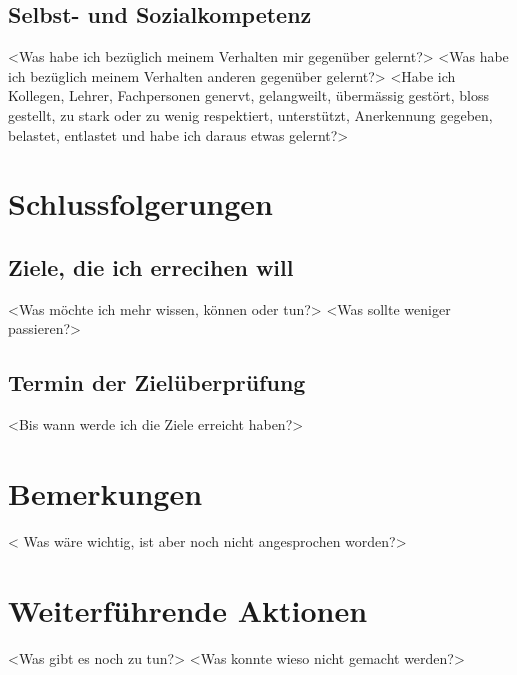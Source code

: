 \subsection{Selbst- und Sozialkompetenz}
<Was habe ich bezüglich meinem Verhalten mir gegenüber gelernt?>
<Was habe ich bezüglich meinem Verhalten anderen gegenüber gelernt?>
<Habe ich Kollegen, Lehrer, Fachpersonen genervt, gelangweilt, übermässig gestört, bloss gestellt, zu stark oder zu wenig respektiert, unterstützt, Anerkennung gegeben, belastet, entlastet und habe ich daraus etwas gelernt?>

\section{Schlussfolgerungen}
\subsection{Ziele, die ich errecihen will}
<Was möchte ich mehr wissen, können oder tun?>
<Was sollte weniger passieren?>
\subsection{Termin der Zielüberprüfung}
<Bis wann werde ich die Ziele erreicht haben?>

\section{Bemerkungen}
< Was wäre wichtig, ist aber noch nicht angesprochen worden?>

\section{Weiterführende Aktionen}
<Was gibt es noch zu tun?>
<Was konnte wieso nicht gemacht werden?>
